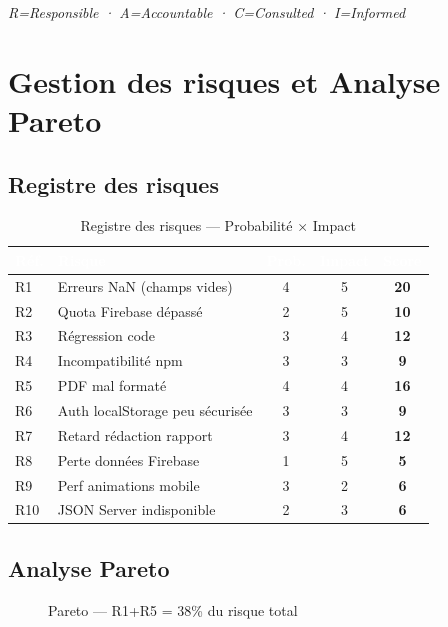 \textit{R=Responsible · A=Accountable · C=Consulted · I=Informed}

\section{Gestion des risques et Analyse Pareto}

\subsection{Registre des risques}

\begin{table}[H]
\centering
\caption{Registre des risques — Probabilité × Impact}
\label{tab:risques}
\begin{tabularx}{\textwidth}{|l|X|c|c|c|}
\hline
\rowcolor{emsiblue}\textcolor{white}{\textbf{Réf.}} & \textcolor{white}{\textbf{Risque}} & \textcolor{white}{\textbf{Prob.}} & \textcolor{white}{\textbf{Impact}} & \textcolor{white}{\textbf{Score}} \\
\hline
R1 & Erreurs NaN (champs vides) & 4 & 5 & \textbf{20} \\
R2 & Quota Firebase dépassé & 2 & 5 & \textbf{10} \\
R3 & Régression code & 3 & 4 & \textbf{12} \\
R4 & Incompatibilité npm & 3 & 3 & \textbf{9} \\
R5 & PDF mal formaté & 4 & 4 & \textbf{16} \\
R6 & Auth localStorage peu sécurisée & 3 & 3 & \textbf{9} \\
R7 & Retard rédaction rapport & 3 & 4 & \textbf{12} \\
R8 & Perte données Firebase & 1 & 5 & \textbf{5} \\
R9 & Perf animations mobile & 3 & 2 & \textbf{6} \\
R10 & JSON Server indisponible & 2 & 3 & \textbf{6} \\
\hline
\end{tabularx}
\end{table}

\subsection{Analyse Pareto}

\begin{figure}[H]
\centering
{}
\caption{Pareto — R1+R5 = 38\% du risque total}
\label{fig:pareto_risques}
\end{figure}

